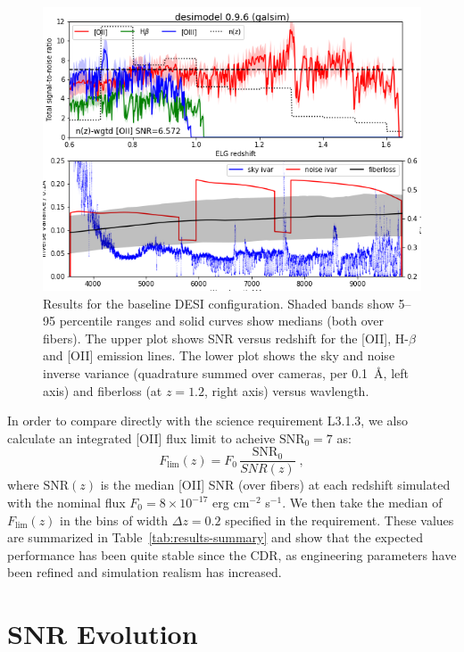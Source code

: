 \documentclass[12pt]{article}
\providecommand{\tab}[1]{Table~\ref{tab:#1}}
\begin{document}
\begin{figure}[htb]
\begin{center}
\includegraphics[width=6in]{results-baseline}
\caption{Results for the baseline DESI configuration. Shaded bands show 5--95 percentile ranges and solid curves show medians (both over fibers).
The upper plot shows SNR versus redshift for the [OII], H-$\beta$ and [OII] emission lines. The lower plot shows the sky and noise inverse variance
(quadrature summed over cameras, per 0.1~\AA, left axis) and fiberloss (at $z=1.2$, right axis) versus wavlength.}
\label{fig:results-baseline}
\end{center}
\end{figure}

In order to compare directly with the science requirement L3.1.3, we also calculate an integrated [OII] flux limit to acheive $\text{SNR}_0 = 7$ as:
$$
F_{\text{lim}}(z) = F_0\,\frac{\text{SNR}_0}{SNR(z)} \; ,
$$
where $\text{SNR}(z)$ is the median [OII] SNR (over fibers) at each redshift simulated with the nominal flux $F_0 = 8\times 10^{-17}$ erg cm$^{-2}$ s$^{-1}$.
We then take the median of $F_{\text{lim}}(z)$ in the bins
of width $\Delta z = 0.2$ specified in the requirement. These values are summarized in \tab{results-summary} and show that the expected performance has
been quite stable since the CDR, as engineering parameters have been refined and simulation realism has increased.

\section{SNR Evolution}
\end{document}

